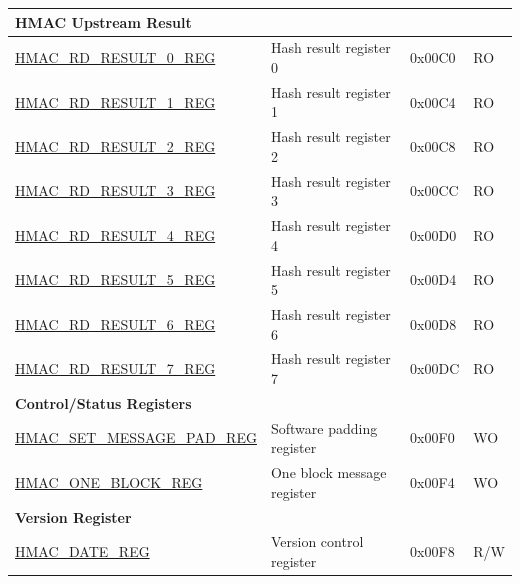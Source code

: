 \begin{longtable}{ | p{6cm} | p{7.2cm} | p{1.3cm} | p{1cm} | }
\multicolumn{4}{|l|}{\textbf{HMAC Upstream Result}} \\ \hline
\hyperref[regdesc:HMACRDRESULTNREG]{HMAC\_RD\_RESULT\_0\_REG} & Hash result register 0 & 0x00C0 & RO \\ \hline
\hyperref[regdesc:HMACRDRESULTNREG]{HMAC\_RD\_RESULT\_1\_REG} & Hash result register 1 & 0x00C4 & RO \\ \hline
\hyperref[regdesc:HMACRDRESULTNREG]{HMAC\_RD\_RESULT\_2\_REG} & Hash result register 2 & 0x00C8 & RO \\ \hline
\hyperref[regdesc:HMACRDRESULTNREG]{HMAC\_RD\_RESULT\_3\_REG} & Hash result register 3 & 0x00CC & RO \\ \hline
\hyperref[regdesc:HMACRDRESULTNREG]{HMAC\_RD\_RESULT\_4\_REG} & Hash result register 4 & 0x00D0 & RO \\ \hline
\hyperref[regdesc:HMACRDRESULTNREG]{HMAC\_RD\_RESULT\_5\_REG} & Hash result register 5 & 0x00D4 & RO \\ \hline
\hyperref[regdesc:HMACRDRESULTNREG]{HMAC\_RD\_RESULT\_6\_REG} & Hash result register 6 & 0x00D8 & RO \\ \hline
\hyperref[regdesc:HMACRDRESULTNREG]{HMAC\_RD\_RESULT\_7\_REG} & Hash result register 7 & 0x00DC & RO \\ \hline
\multicolumn{4}{|l|}{\textbf{Control/Status Registers}} \\ \hline
\hyperref[regdesc:HMACSETMESSAGEPADREG]{HMAC\_SET\_MESSAGE\_PAD\_REG} & Software padding register & 0x00F0 & WO \\ \hline
\hyperref[regdesc:HMACONEBLOCKREG]{HMAC\_ONE\_BLOCK\_REG} & One block message register & 0x00F4 & WO \\ \hline
\multicolumn{4}{|l|}{\textbf{Version Register}} \\ \hline
\hyperref[regdesc:HMACDATEREG]{HMAC\_DATE\_REG} & Version control register & 0x00F8 & R/W \\ \hline
\end{longtable}
